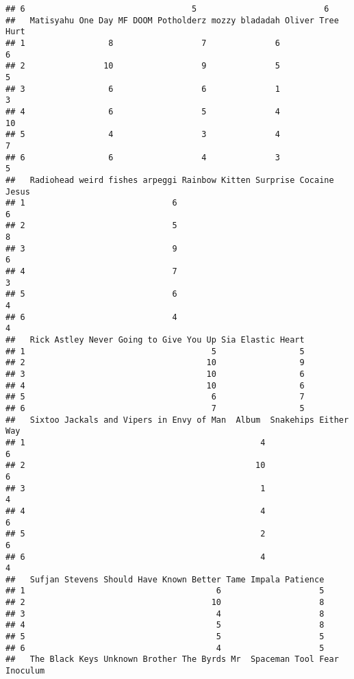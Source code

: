 \documentclass[]{article}
\begin{document}
\begin{verbatim}
## 6                                  5                          6
##   Matisyahu One Day MF DOOM Potholderz mozzy bladadah Oliver Tree Hurt
## 1                 8                  7              6                6
## 2                10                  9              5                5
## 3                 6                  6              1                3
## 4                 6                  5              4               10
## 5                 4                  3              4                7
## 6                 6                  4              3                5
##   Radiohead weird fishes arpeggi Rainbow Kitten Surprise Cocaine Jesus
## 1                              6                                     6
## 2                              5                                     8
## 3                              9                                     6
## 4                              7                                     3
## 5                              6                                     4
## 6                              4                                     4
##   Rick Astley Never Going to Give You Up Sia Elastic Heart
## 1                                      5                 5
## 2                                     10                 9
## 3                                     10                 6
## 4                                     10                 6
## 5                                      6                 7
## 6                                      7                 5
##   Sixtoo Jackals and Vipers in Envy of Man  Album  Snakehips Either Way
## 1                                                4                    6
## 2                                               10                    6
## 3                                                1                    4
## 4                                                4                    6
## 5                                                2                    6
## 6                                                4                    4
##   Sufjan Stevens Should Have Known Better Tame Impala Patience
## 1                                       6                    5
## 2                                      10                    8
## 3                                       4                    8
## 4                                       5                    8
## 5                                       5                    5
## 6                                       4                    5
##   The Black Keys Unknown Brother The Byrds Mr  Spaceman Tool Fear Inoculum

\end{verbatim}
\end{document}
